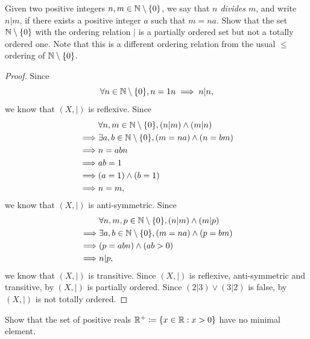 \begin{ex}\label{i:ex:8.5.3}
  Given two positive integers \(n, m \in \mathbb{N} \setminus \left\lbrace0\right\rbrace\), we say that \emph{\(n\) divides \(m\)}, and write \(n | m\), if there exists a positive integer \(a\) such that \(m = na\).
  Show that the set \(\mathbb{N} \setminus \left\lbrace0\right\rbrace\) with the ordering relation \(|\) is a partially ordered set but not a totally ordered one.
  Note that this is a different ordering relation from the usual \(\leq\) ordering of \(\mathbb{N} \setminus \left\lbrace0\right\rbrace\).
\end{ex}

\begin{proof}
  Since
  \[
    \forall n \in \N \setminus \set{0}, n = 1n \implies n | n,
  \]
  we know that \((X, |)\) is reflexive.
  Since
  \begin{align*}
             & \forall n, m \in \N \setminus \set{0}, (n | m) \land (m | n)   \\
    \implies & \exists a, b \in \N \setminus \set{0}, (m = na) \land (n = bm) \\
    \implies & n = abn                                                        \\
    \implies & ab = 1                                                         \\
    \implies & (a = 1) \land (b = 1)                                          \\
    \implies & n = m,
  \end{align*}
  we know that \((X, |)\) is anti-symmetric.
  Since
  \begin{align*}
             & \forall n, m, p \in \N \setminus \set{0}, (n | m) \land (m | p) \\
    \implies & \exists a, b \in \N \setminus \set{0}, (m = na) \land (p = bm)  \\
    \implies & (p = abn) \land (ab > 0)                                        \\
    \implies & n | p,
  \end{align*}
  we know that \((X, |)\) is transitive.
  Since \((X, |)\) is reflexive, anti-symmetric and transitive, by  \((X, |)\) is partially ordered.
  Since \((2 | 3) \lor (3 | 2)\) is false, by  \((X, |)\) is not totally ordered.
\end{proof}

\begin{ex}\label{i:ex:8.5.4}
  Show that the set of positive reals \(\mathbb{R}^+ \coloneqq \left\lbrace x \in \mathbb{R} : x > 0\right\rbrace\) have no minimal element.
\end{ex}

